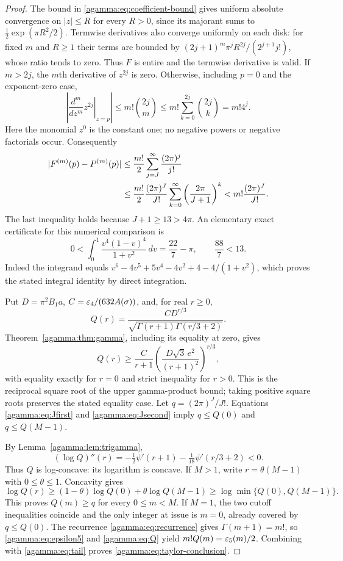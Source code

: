 \begin{proof}
The bound in \eqref{agamma:eq:coefficient-bound} gives uniform absolute
convergence on $|z|\le R$ for every $R>0$, since its majorant sums
to $\tfrac12\exp(\pi R^2/2)$. Termwise derivatives also converge
uniformly on each disk: for fixed $m$ and $R\ge1$ their terms are
bounded by $(2j+1)^m\pi^j R^{2j}/(2^{j+1}j!)$, whose ratio tends
to zero. Thus $F$ is entire and the termwise derivative is valid.
If $m>2j$, the $m$th derivative of $z^{2j}$ is zero. Otherwise,
including $p=0$ and the exponent-zero case,
\[
\left|\left.\frac{d^m}{dz^m}z^{2j}\right|_{z=p}\right|
\le m!\binom{2j}{m}\le m!\sum_{k=0}^{2j}\binom{2j}{k}
=m!4^j.
\]
Here the monomial $z^0$ is the constant one; no negative powers
or negative factorials occur. Consequently
\begin{align}
|F^{(m)}(p)-P^{(m)}(p)|
&\le\frac{m!}{2}\sum_{j=J}^\infty\frac{(2\pi)^j}{j!}\notag\\
&\le\frac{m!}{2}\frac{(2\pi)^J}{J!}
\sum_{k=0}^\infty\left(\frac{2\pi}{J+1}\right)^k
<m!\frac{(2\pi)^J}{J!}.\label{agamma:eq:tail}
\end{align}
The last inequality holds because $J+1\ge13>4\pi$.
An elementary exact certificate for this numerical comparison is
\[
0<\int_0^1\frac{v^4(1-v)^4}{1+v^2}\,dv
=\frac{22}{7}-\pi,\qquad \frac{88}{7}<13.
\]
Indeed the integrand equals
$v^6-4v^5+5v^4-4v^2+4-4/(1+v^2)$, which proves the stated
integral identity by direct integration.

Put $D=\pi^2B_1a$, $C=\varepsilon_4/(632A(\sigma))$, and, for real $r\ge0$,
\begin{equation}\label{agamma:eq:Q}
Q(r)=\frac{CD^{r/3}}{\sqrt{\Gamma(r+1)\Gamma(r/3+2)}}.
\end{equation}
Theorem~\ref{agamma:thm:gamma}, including its equality at zero, gives
\begin{equation}\label{agamma:eq:Qlower}
Q(r)\ge\frac{C}{r+1}
\left(\frac{D\sqrt3\,e^2}{(r+1)^2}\right)^{r/3},
\end{equation}
with equality exactly for $r=0$ and strict inequality for $r>0$.
This is the reciprocal square root of the upper gamma-product
bound; taking positive square roots preserves the stated equality
case. Let $q=(2\pi)^J/J!$. Equations \eqref{agamma:eq:Jfirst} and
\eqref{agamma:eq:Jsecond} imply $q\le Q(0)$ and $q\le Q(M-1)$.

By Lemma~\ref{agamma:lem:trigamma},
\begin{equation}\label{agamma:eq:Qconcavity}
(\log Q)''(r)=-\tfrac12\psi'(r+1)
-\tfrac1{18}\psi'(r/3+2)<0.
\end{equation}
Thus $Q$ is log-concave: its logarithm is concave. If $M>1$,
write $r=\theta(M-1)$ with $0\le\theta\le1$. Concavity gives
\[
\log Q(r)\ge(1-\theta)\log Q(0)+\theta\log Q(M-1)
\ge\log\min\{Q(0),Q(M-1)\}.
\]
This proves $Q(m)\ge q$ for every $0\le m<M$.
If $M=1$, the two cutoff inequalities coincide and the only
integer at issue is $m=0$, already covered by $q\le Q(0)$.
The recurrence \eqref{agamma:eq:recurrence} gives $\Gamma(m+1)=m!$,
so \eqref{agamma:eq:epsilon5} and \eqref{agamma:eq:Q} yield
$m!Q(m)=\varepsilon_5(m)/2$. Combining with \eqref{agamma:eq:tail} proves
\eqref{agamma:eq:taylor-conclusion}.


\end{proof}
